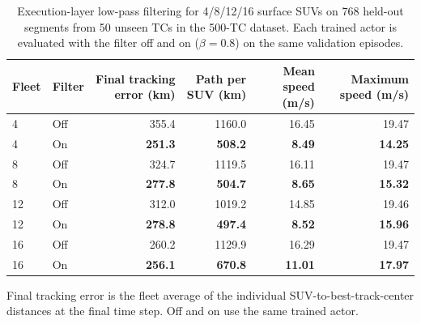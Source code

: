 \begin{table}[htbp]
\centering
\caption{Execution-layer low-pass filtering for 4/8/12/16 surface SUVs on 768 held-out segments from 50 unseen TCs in the 500-TC dataset. Each trained actor is evaluated with the filter off and on ($\beta=0.8$) on the same validation episodes.}
\label{tab:surface_control_ablations}
\scriptsize
\setlength{\tabcolsep}{2.5pt}
\renewcommand{\arraystretch}{0.9}
\begin{tabular*}{\textwidth}{@{\extracolsep{\fill}}llrrrr@{}}
\toprule
Fleet & Filter & Final tracking error (km) & Path per SUV (km) & Mean speed (m/s) & Maximum speed (m/s) \\
\midrule
4 & Off & 355.4 & 1160.0 & 16.45 & 19.47 \\
4 & On & \textbf{251.3} & \textbf{508.2} & \textbf{8.49} & \textbf{14.25} \\
8 & Off & 324.7 & 1119.5 & 16.11 & 19.47 \\
8 & On & \textbf{277.8} & \textbf{504.7} & \textbf{8.65} & \textbf{15.32} \\
12 & Off & 312.0 & 1019.2 & 14.85 & 19.46 \\
12 & On & \textbf{278.8} & \textbf{497.4} & \textbf{8.52} & \textbf{15.96} \\
16 & Off & 260.2 & 1129.9 & 16.29 & 19.47 \\
16 & On & \textbf{256.1} & \textbf{670.8} & \textbf{11.01} & \textbf{17.97} \\
\bottomrule
\end{tabular*}
\par\smallskip
\parbox{\textwidth}{\footnotesize Final tracking error is the fleet average of the individual SUV-to-best-track-center distances at the final time step. Off and on use the same trained actor.}
\end{table}
